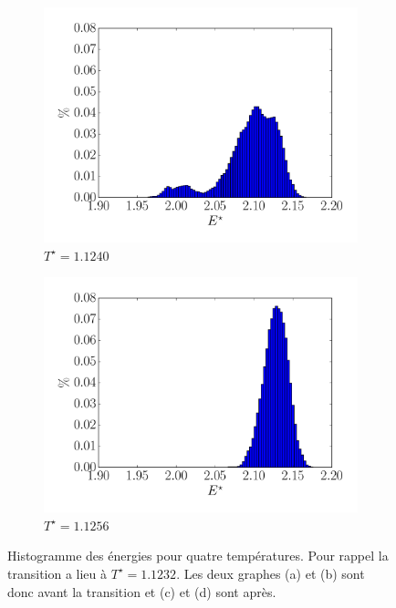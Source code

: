 \documentclass[11pt,a4paper]{article}
\numberwithin{equation}{section}
\begin{document}
\begin{figure}
    \begin{subfigure}[b]{0.49\textwidth}
    	\center
    	\includegraphics[scale=0.4]{figures/histo_11240.pdf}
    	\caption{$T^\star =1.1240$}
    	\label{11240}
    \end{subfigure}	
    \begin{subfigure}[b]{0.49\textwidth}
    	\center
    	\includegraphics[scale=0.4]{figures/histo_11256.pdf}
    	\caption{$T^\star =1.1256$}
    	\label{11256}
    \end{subfigure}	
    \caption{Histogramme des énergies pour quatre températures. Pour rappel la transition a lieu à $T^\star = 1.1232$. Les deux graphes (a) et (b) sont donc avant la transition et (c) et (d) sont après.}
    \label{histoo}
\end{figure}
\end{document}
